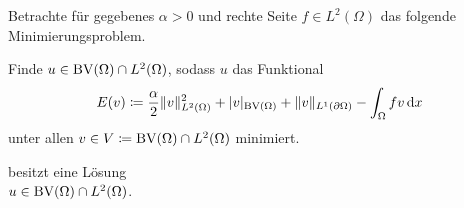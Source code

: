 Betrachte für gegebenes $\alpha>0$ und rechte Seite $f\in L^2(\Omega)$ das 
folgende Minimierungsproblem. 

\begin{problem}\label{prob:continuousProblem}
  Finde $u\in \textup{BV}(\Omega)\cap L^2(\Omega)$, sodass
  $u$ das Funktional
  \begin{align}\label{eq:continuousProblem}
    E(v)\coloneqq \frac{\alpha}{2}\Vert v\Vert_{L^2(\Omega)}^2 + |v|_{\textup{BV}(\Omega)}
    +\Vert v\Vert_{L^1(\partial\Omega)}-\int_\Omega fv\,\mathrm{d}x
  \end{align}
  unter allen $v\in V\coloneqq\textup{BV}(\Omega)\cap L^2(\Omega)$ minimiert.
\end{problem}

\begin{theorem}
  \label{thm:contProblemExistence}
   besitzt eine Lösung \\$u\in\textup{BV}(\Omega)\cap
  L^2(\Omega)$.
\end{theorem}

